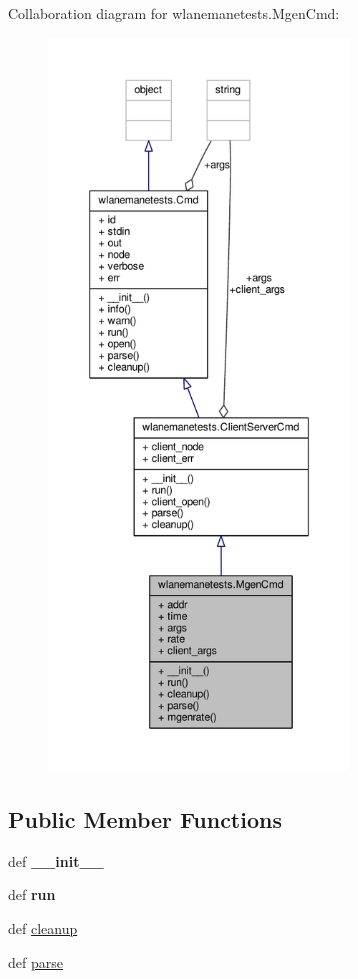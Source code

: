 Collaboration diagram for wlanemanetests.\+Mgen\+Cmd\+:
\nopagebreak
\begin{figure}[H]
\begin{center}
\leavevmode
\includegraphics[height=550pt]{classwlanemanetests_1_1_mgen_cmd__coll__graph}
\end{center}
\end{figure}
\subsection*{Public Member Functions}
\begin{DoxyCompactItemize}
\item 
\hypertarget{classwlanemanetests_1_1_mgen_cmd_a3e08ce229035355398636fd519cc4331}{def {\bfseries \+\_\+\+\_\+init\+\_\+\+\_\+}}\label{classwlanemanetests_1_1_mgen_cmd_a3e08ce229035355398636fd519cc4331}

\item 
\hypertarget{classwlanemanetests_1_1_mgen_cmd_ad1d9ba29c14b3f144a0d39db1e404b28}{def {\bfseries run}}\label{classwlanemanetests_1_1_mgen_cmd_ad1d9ba29c14b3f144a0d39db1e404b28}

\item 
def \hyperlink{classwlanemanetests_1_1_mgen_cmd_a94c8bc9e81749530e60439d0b8e09fc9}{cleanup}
\item 
def \hyperlink{classwlanemanetests_1_1_mgen_cmd_a1062fbfdddec8943279d706e000e55a5}{parse}
\end{DoxyCompactItemize}
